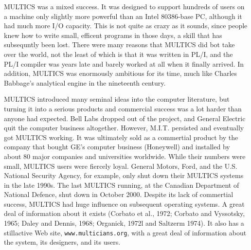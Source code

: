 \documentclass{book}
\newcommand {\www} [1] {\texttt{#1}}
\begin{document}
MULTICS was a mixed success.
It was designed to support hundreds of users on a machine only slightly more powerful than an Intel 80386-base PC,
although it had much more I/O capacity.
This is not quite as crazy as it sounds, since people knew how to write small, efficent programs in those days, a skill that has subsequntly been lost.
There were many reasons that MULTICS did bot take over the world, not the least of which is that it was written in PL/I, 
and the PL/I compiler was years late and barely worked at all when it finally arrived.
In addition, MULTICS was enormously ambitious for its time, much like Charles Babbage's analytical engine in the nineteenth century.

MULTICS introduced many seminal ideas into the computer literature, 
but turning it into a serious products and commercial success was a lot harder than anyone had expected.
Bell Labs dropped out of the project, and General Electric quit the computer business altogether.
However, M.I.T. persisted and eventually got MULTICS working.
It was ultimately sold as a commertial product by the company that bought GE's computer business (Honeywell) 
and installed by about 80 major companies and universities worldwide.
While their numbers were small, MULTICS users were fiercely loyal.
General Motors, Ford, and the U.S. National Security Agency, for example, only shut down their MULTICS systems in the late 1990s.
The last MULTICS running, at the Canadian Department of National Defence, shut down in October 2000.
Despite its lack of commertial success, MULTICS had huge influence on subsequent operating systems.
A great deal of information about it exists (Corbato et al., 1972; Corbato and Vyssotsky, 1965; Daley and Dennis, 1968; Organick, 1972l and Saltzerm 1974).
It also has a stillactive Web site, \www{www.multicians.org}, with a great deal of information about the system, its designers, and its users.
\end{document}
